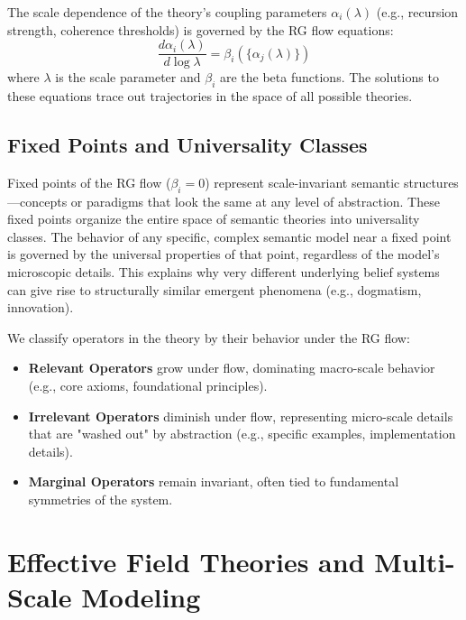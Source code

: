 The scale dependence of the theory's coupling parameters \(\alpha_i(\lambda)\) (e.g., recursion strength, coherence thresholds) is governed by the RG flow equations:
\begin{equation}
\frac{d\alpha_i(\lambda)}{d\log\lambda} = \beta_i(\{\alpha_j(\lambda)\})
\end{equation}
where \(\lambda\) is the scale parameter and \(\beta_i\) are the beta functions. The solutions to these equations trace out trajectories in the space of all possible theories.

\subsection{Fixed Points and Universality Classes}

Fixed points of the RG flow (\(\beta_i = 0\)) represent scale-invariant semantic structures—concepts or paradigms that look the same at any level of abstraction. These fixed points organize the entire space of semantic theories into universality classes. The behavior of any specific, complex semantic model near a fixed point is governed by the universal properties of that point, regardless of the model's microscopic details. This explains why very different underlying belief systems can give rise to structurally similar emergent phenomena (e.g., dogmatism, innovation).

We classify operators in the theory by their behavior under the RG flow:
\begin{itemize}
    \item \textbf{Relevant Operators} grow under flow, dominating macro-scale behavior (e.g., core axioms, foundational principles).
    \item \textbf{Irrelevant Operators} diminish under flow, representing micro-scale details that are "washed out" by abstraction (e.g., specific examples, implementation details).
    \item \textbf{Marginal Operators} remain invariant, often tied to fundamental symmetries of the system.
\end{itemize}

\section{Effective Field Theories and Multi-Scale Modeling}

